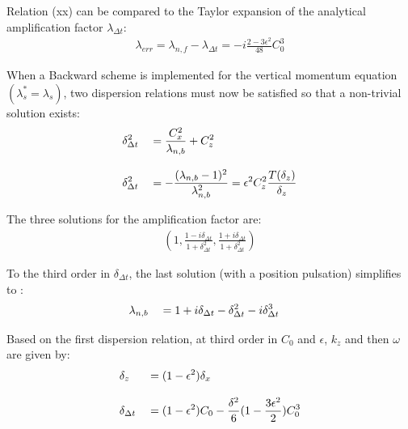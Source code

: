 \documentclass[a4paper]{article}
\numberwithin{equation}{section}
\begin{document}
Relation (xx) can be compared to the Taylor expansion of the analytical amplification factor $\lambda_{\Delta t}$:
\begin{equation}
   \begin{split}
    \displaystyle
     \lambda_{err}=\lambda_{n,f}-\lambda_{\Delta t}=
     -i\frac{ 2 - 3 \epsilon^2 }{48}C_0^3
   \end{split}
\end{equation}

When a Backward scheme is implemented for the vertical momentum equation $(\lambda_s^*=\lambda_s)$, two dispersion relations must now be satisfied so that a non-trivial solution exists:
\begin{equation}
   \begin{split}
    \displaystyle
    & \delta_{\Delta t}^2 && = \frac{C_x^2}{\lambda_{n,b}} + C_z^2  \\[3mm]
    \displaystyle
    & \delta_{\Delta t}^2 && = -\frac{(\lambda_{n,b}-1)^2}{\lambda_{n,b}^2}
      =\epsilon^2 C_z^2 \frac{T(\delta_z)}{\delta_z}
   \end{split}
\end{equation}


The three solutions for the amplification factor are:
\begin{equation}
   \begin{split}
    \displaystyle
    (1,\frac{1-i\delta_{\Delta t}}{1+\delta_{\Delta t}^2},\frac{1+i\delta_{\Delta t}}{1+\delta_{\Delta t}^2})
   \end{split}
\end{equation}

To the third order in $\delta_{\Delta t}$, the last solution (with a position pulsation) simplifies to :\\
\begin{equation}
   \begin{split}
    \displaystyle
    & \lambda_{n,b} &&=1+i \delta_{\Delta t} - \delta_{\Delta t}^2 -i \delta_{\Delta t}^3
   \end{split}
\end{equation}

Based on the first dispersion relation, at third order in $C_0$ and $\epsilon $, $k_z$  and then $\omega$ are given by:
\begin{equation}
   \begin{split}
    \displaystyle
    & \delta_{z} &&=(1-\epsilon^2)\delta_x\\[3mm]
    \displaystyle
    & \delta_{\Delta t} &&=(1-\epsilon^2)C_0-\frac{\delta^2}{6}(1-\frac{3\epsilon^2}{2})C_0^3
   \end{split}
\end{equation}
 
\end{document}
